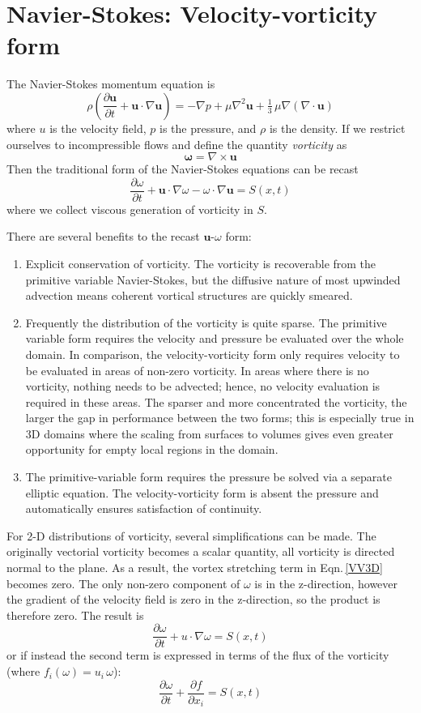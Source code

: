 \documentclass[letterpaper,12pt]{report}
\newcommand{\be}{\begin{equation}}
\newcommand{\ben}[1]{\begin{equation}\label{#1}}
\newcommand{\ee}{\end{equation}}
\begin{document}
\section{Navier-Stokes: Velocity-vorticity form}
The Navier-Stokes momentum equation is
 \be \rho \left(\frac{\partial \mathbf{u}}{\partial t} + \mathbf{u} \cdot \nabla \mathbf{u} \right) = -\nabla p + \mu \nabla^2 \mathbf u + \tfrac13 \, \mu \nabla (\nabla\cdot\mathbf{u}) \ee
where $u$ is the velocity field, $p$ is the pressure, and $\rho$ is the density. If we restrict ourselves to incompressible flows and define the quantity \textit{vorticity} as
\be \mathbf{\omega} = \nabla \times \mathbf{u} \ee
Then the traditional form of the Navier-Stokes equations can be recast
\ben{VV3D} \frac{\partial \omega}{\partial t} +  \mathbf{u} \cdot \nabla \omega - \omega \cdot \nabla  \mathbf{u} = S(x,t)\ee
where we collect viscous generation of vorticity in $S$.

There are several benefits to the recast $\mathbf{u}$-$\omega$ form:
\begin{enumerate}
\item Explicit conservation of vorticity. The vorticity is recoverable from the primitive variable Navier-Stokes, but the diffusive nature of most upwinded advection means coherent vortical structures are quickly smeared.
\item Frequently the distribution of the vorticity is quite sparse. The primitive variable form requires the velocity and pressure be evaluated over the whole domain. In comparison, the velocity-vorticity form only requires velocity to be evaluated in areas of non-zero vorticity. In areas where there is no vorticity, nothing needs to be advected; hence, no velocity evaluation is required in these areas. The sparser and more concentrated the vorticity, the larger the gap in performance between the two forms; this is especially true in 3D domains where the scaling from surfaces to volumes gives even greater opportunity for empty local regions in the domain. 
\item The primitive-variable form requires the pressure be  solved via a separate elliptic equation. The velocity-vorticity form is absent the pressure and automatically ensures satisfaction of continuity.
\end{enumerate}

For 2-D distributions of vorticity, several simplifications can be made. The originally vectorial vorticity becomes a scalar quantity, all vorticity is directed normal to the plane. As a result, the vortex stretching term in  Eqn.\,\eqref{VV3D} becomes zero. The only non-zero component of $\omega$ is in the z-direction, however the gradient of the velocity field is zero in the z-direction, so the product is therefore zero. The result is
\ben{VV2D} \frac{\partial \omega}{\partial t} + u \cdot \nabla \omega = S(x,t)\ee
or if instead the second term is expressed in terms of the flux of the vorticity (where $f_i(\omega)=u_i\,\omega$):
\ben{VV2DB} \frac{\partial \omega}{\partial t} + \frac{\partial f}{\partial x_i}= S(x,t)\ee
\end{document}

